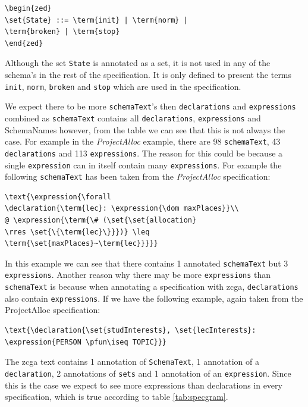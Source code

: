 \begin{verbatim}
\begin{zed}
\set{State} ::= \term{init} | \term{norm} |
\term{broken} | \term{stop}
\end{zed}
\end{verbatim}

Although the set \verb|State| is annotated as a set, it is not used in any of the schema's in the rest of the specification. It is only defined to present the terms \verb|init|, \verb|norm|, \verb|broken| and \verb|stop| which are used in the specification.

We expect there to be more \texttt{schemaText}'s then \texttt{declarations} and \texttt{expressions} combined as \texttt{schemaText} contains all \texttt{declarations}, \texttt{expressions} and SchemaNames however, from the table we can see that this is not always the case. For example in the \emph{ProjectAlloc} example, there are 98 \texttt{schemaText}, 43 \texttt{declarations} and 113 \texttt{expressions}. The reason for this could be because a single \texttt{expression} can in itself contain many \texttt{expressions}. For example the following \texttt{schemaText} has been taken from the \emph{ProjectAlloc} specification:

\begin{verbatim}
\text{\expression{\forall 
\declaration{\term{lec}: \expression{\dom maxPlaces}}\\
@ \expression{\term{\# (\set{\set{allocation}
\rres \set{\{\term{lec}\}}})} \leq \term{\set{maxPlaces}~\term{lec}}}}}
\end{verbatim}

In this example we can see that there contains 1 annotated \texttt{schemaText} but 3 \texttt{expressions}.
Another reason why there may be more \texttt{expressions} than \texttt{schemaText} is because when annotating a specification with \gls{zcga}, \texttt{declarations} also contain \texttt{expressions}. If we have the following example, again taken from the ProjectAlloc specification:

\begin{verbatim}
\text{\declaration{\set{studInterests}, \set{lecInterests}:
\expression{PERSON \pfun\iseq TOPIC}}}
\end{verbatim}

The \gls{zcga} text contains 1 annotation of \texttt{SchemaText}, 1 annotation of a \texttt{declaration}, 2 annotations of \texttt{sets} and 1 annotation of an \texttt{expression}. Since this is the case we expect to see more expressions than declarations in every specification, which is true according to table \ref{tab:specgram}.


